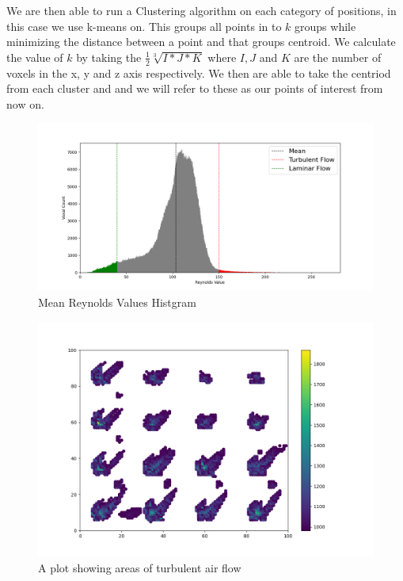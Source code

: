  We are then able to run a Clustering algorithm on each category of positions, in this case we use k-means on. This groups all points in to \ensuremath{k} groups while minimizing the distance between a point and that groups centroid. We calculate the value of \ensuremath{k} by taking the \ensuremath{\frac{1}{2}\sqrt[3]{I*J*K}} where \ensuremath{I,J} and \ensuremath{K} are the number of voxels in the x, y and z axis respectively. We then are able to take the centriod from each cluster and and we will refer to these as our points of interest from now on.

\begin{figure}
\centering
\includegraphics[scale=.25]{Figures/MethodsGraph.png}
\decoRule
\caption[A histogram]{Mean Reynolds Values Histgram}
\label{fig:MHistgram}
\end{figure}

\begin{figure}
\centering
\includegraphics[scale=.25]{Figures/Turb2d.png}
\decoRule
\caption[Turbulent Air Flow Skatter Plot]{A plot showing areas of turbulent air flow}
\label{fig:MTurbulentflow}
\end{figure}
